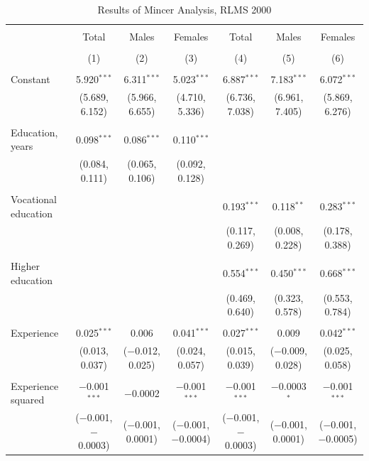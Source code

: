 \documentclass[12pt,a4paper]{article}
\numberwithin{equation}{section}
\begin{document}
\begin{landscape}
	
	\fontsize{9}{11}
	\selectfont
	
	\begin{table}[!htbp] \centering 
		\caption{Results of Mincer Analysis, RLMS 2000} 
		\label{} 
		\begin{tabular}{@{\extracolsep{5pt}}lcccccc} 
			\\[-1.8ex]\hline 
			\hline \\[-1.8ex] 
			& Total & Males & Females & Total & Males & Females \\ 
			\\[-1.8ex] & (1) & (2) & (3) & (4) & (5) & (6)\\ 
			\hline \\[-1.8ex] 
			Constant & 5.920$^{***}$ & 6.311$^{***}$ & 5.023$^{***}$ & 6.887$^{***}$ & 7.183$^{***}$ & 6.072$^{***}$ \\ 
			& (5.689, 6.152) & (5.966, 6.655) & (4.710, 5.336) & (6.736, 7.038) & (6.961, 7.405) & (5.869, 6.276) \\ 
			& & & & & & \\ 
			Education, years & 0.098$^{***}$ & 0.086$^{***}$ & 0.110$^{***}$ &  &  &  \\ 
			& (0.084, 0.111) & (0.065, 0.106) & (0.092, 0.128) &  &  &  \\ 
			& & & & & & \\ 
			Vocational education &  &  &  & 0.193$^{***}$ & 0.118$^{**}$ & 0.283$^{***}$ \\ 
			&  &  &  & (0.117, 0.269) & (0.008, 0.228) & (0.178, 0.388) \\ 
			& & & & & & \\ 
			Higher education &  &  &  & 0.554$^{***}$ & 0.450$^{***}$ & 0.668$^{***}$ \\ 
			&  &  &  & (0.469, 0.640) & (0.323, 0.578) & (0.553, 0.784) \\ 
			& & & & & & \\ 
			Experience & 0.025$^{***}$ & 0.006 & 0.041$^{***}$ & 0.027$^{***}$ & 0.009 & 0.042$^{***}$ \\ 
			& (0.013, 0.037) & ($-$0.012, 0.025) & (0.024, 0.057) & (0.015, 0.039) & ($-$0.009, 0.028) & (0.025, 0.058) \\ 
			& & & & & & \\ 
			Experience squared & $-$0.001$^{***}$ & $-$0.0002 & $-$0.001$^{***}$ & $-$0.001$^{***}$ & $-$0.0003$^{*}$ & $-$0.001$^{***}$ \\ 
			& ($-$0.001, $-$0.0003) & ($-$0.001, 0.0001) & ($-$0.001, $-$0.0004) & ($-$0.001, $-$0.0003) & ($-$0.001, 0.0001) & ($-$0.001, $-$0.0005) \\ 

\end{tabular}
\end{table}
\end{landscape}
\end{document}
